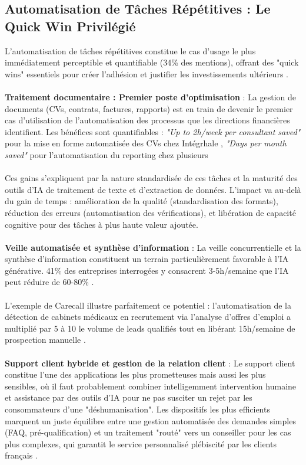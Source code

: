 \subsection{Automatisation de Tâches Répétitives : Le Quick Win Privilégié}

L'automatisation de tâches répétitives constitue le cas d'usage le plus immédiatement perceptible et quantifiable (34\% des mentions), offrant des "quick wins" essentiels pour créer l'adhésion et justifier les investissements ultérieurs \cite{luwai2025meetings}.
\\\\
\textbf{Traitement documentaire : Premier poste d'optimisation} :  La gestion de documents (CVs, contrats, factures, rapports) est en train de devenir le premier cas d'utilisation de l'automatisation des processus que les directions financières identifient. Les bénéfices sont quantifiables : \emph{"Up to 2h/week per consultant saved"} pour la mise en forme automatisée des CVs chez Intégrhale \cite{luwai2025integrhale}, \emph{"Days per month saved"} pour l'automatisation du reporting chez plusieurs 
\\\\
Ces gains s'expliquent par la nature standardisée de ces tâches et la maturité des outils d'IA de traitement de texte et d'extraction de données. L'impact va au-delà du gain de temps : amélioration de la qualité (standardisation des formats), réduction des erreurs (automatisation des vérifications), et libération de capacité cognitive pour des tâches à plus haute valeur ajoutée.
\\\\
\textbf{Veille automatisée et synthèse d'information} : La veille concurrentielle et la synthèse d'information constituent un terrain particulièrement favorable à l'IA générative. 41\% des entreprises interrogées y consacrent 3-5h/semaine que l'IA peut réduire de 60-80\% \cite{luwai2025meetings}.
\\\\
L'exemple de Carecall illustre parfaitement ce potentiel : l'automatisation de la détection de cabinets médicaux en recrutement via l'analyse d'offres d'emploi a multiplié par 5 à 10 le volume de leads qualifiés tout en libérant 15h/semaine de prospection manuelle \cite{luwai2025carecall}.
\\\\
\textbf{Support client hybride et gestion de la relation client} : Le support client constitue l'une des applications les plus prometteuses mais aussi les plus sensibles, où il faut probablement combiner intelligemment intervention humaine et assistance par des outils d'IA pour ne pas susciter un rejet par les consommateurs d'une "déshumanisation". Les dispositifs les plus efficients marquent un juste équilibre entre une gestion automatisée des demandes simples (FAQ, pré-qualification) et un traitement "routé" vers un conseiller pour les cas plus complexes, qui garantit le service personnalisé plébiscité par les clients français \cite{meyer2014culture}.

